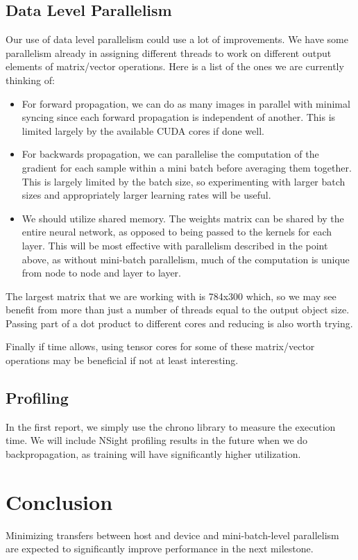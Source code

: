 \documentclass[sigconf,authorversion,nonacm]{acmart}
\begin{document}
\subsection{Data Level Parallelism}

Our use of data level parallelism could use a lot of improvements. We have some parallelism already in assigning different threads to work on different output elements of matrix/vector operations. Here is a list of the ones we are currently thinking of:
\begin{itemize}
    \item For forward propagation, we can do as many images in parallel with minimal syncing since each forward propagation is independent of another. This is limited largely by the available CUDA cores if done well.
    \item For backwards propagation, we can parallelise the computation of the gradient for each sample within a mini batch before averaging them together. This is largely limited by the batch size, so experimenting with larger batch sizes and appropriately larger learning rates will be useful.
    \item We should utilize shared memory. The weights matrix can be shared by the entire neural network, as opposed to being passed to the kernels for each layer. This will be most effective with parallelism described in the point above, as without mini-batch parallelism, much of the computation is unique from node to node and layer to layer.
\end{itemize}

The largest matrix that we are working with is 784x300 which, so we may see benefit from more than just a number of threads equal to the output object size. Passing part of a dot product to different cores and reducing is also worth trying.

Finally if time allows, using tensor cores for some of these matrix/vector operations may be beneficial if not at least interesting.

\subsection{Profiling}

In the first report, we simply use the chrono library to measure the execution time. We will include NSight profiling results in the future when we do backpropagation, as training will have significantly higher utilization.

\section{Conclusion}
Minimizing transfers between host and device and mini-batch-level parallelism are expected to significantly improve performance in the next milestone.

\printbibliography
\end{document}
